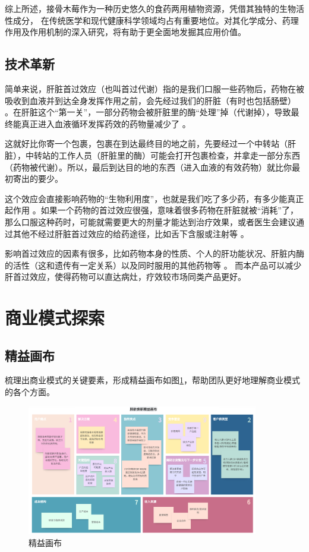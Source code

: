 \documentclass[12pt]{ctexart}
\begin{document}
综上所述，接骨木莓作为一种历史悠久的食药两用植物资源，凭借其独特的生物活性成分，
在传统医学和现代健康科学领域均占有重要地位。对其化学成分、药理作用及作用机制的深入研究，将有助于更全面地发掘其应用价值。

\subsection{技术革新}
\fullboxbegin
简单来说，肝脏首过效应（也叫首过代谢）指的是我们口服一些药物后，药物在被吸收到血液并到达全身发挥作用之前，会先经过我们的肝脏（有时也包括肠壁） 。在肝脏这个“第一关”，一部分药物会被肝脏里的酶“处理”掉（代谢掉），导致最终能真正进入血液循环发挥药效的药物量减少了 。

这就好比你寄一个包裹，包裹在到达最终目的地之前，先要经过一个中转站（肝脏），中转站的工作人员（肝脏里的酶）可能会打开包裹检查，并拿走一部分东西（药物被代谢）。所以，最后到达目的地的东西（进入血液的有效药物）就比你最初寄出的要少。

这个效应会直接影响药物的“生物利用度”，也就是我们吃了多少药，有多少能真正起作用 。如果一个药物的首过效应很强，意味着很多药物在肝脏就被“消耗”了，那么口服这种药时，可能就需要更大的剂量才能达到治疗效果，或者医生会建议通过其他不经过肝脏首过效应的给药途径，比如舌下含服或注射等 。

影响首过效应的因素有很多，比如药物本身的性质、个人的肝功能状况、肝脏内酶的活性（这和遗传有一定关系）以及同时服用的其他药物等 。
\fullboxend
而本产品可以减少肝首过效应，使得药物可以直达病灶，疗效较市场同类产品更好。
\section{商业模式探索}
\subsection{精益画布}
梳理出商业模式的关键要素，形成精益画布如图\ref{fig:lean_canvas}，帮助团队更好地理解商业模式的各个方面。
\begin{figure}[H]
    \centering
    \includegraphics[width=0.9\textwidth]{./reference/精益画布.png}
    \caption{精益画布}
    \label{fig:lean_canvas}
\end{figure}
\end{document}
